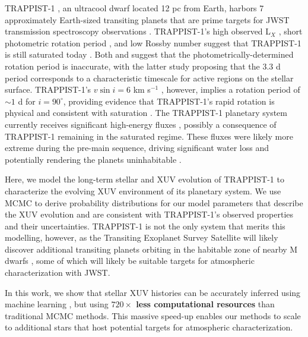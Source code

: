 \documentclass[twocolumn]{aastex62}
\def\lsim{~\rlap{$<$}{\lower 1.0ex\hbox{$\sim$}}}
\newcommand{\xxx}[1]{{\textbf{#1}}}
\newcommand{\approxposterior}[0]{\texttt{approxposterior}\xspace}
\begin{document}
TRAPPIST-1 \citep{Gillon2016,Gillon2017}, an ultracool dwarf located 12 pc from Earth, harbors 7 approximately Earth-sized transiting planets that are prime targets for JWST transmission spectroscopy observations \citep{Morley2017,Lincowski2018,Lustig2019}. TRAPPIST-1's high observed L$_{X}$ \citep{Wheatley2017}, short photometric rotation period \citep[3.3 d, ][]{Luger2017}, and low Rossby number \citep[Ro $\approx 0.01$, ][]{Roettenbacher2017} suggest that TRAPPIST-1 is still saturated today \citep{Pizzolato2003,Wright2011,Wright2018}. Both \citet{Roettenbacher2017} and \citet{Morris2018} suggest that the photometrically-determined rotation period is inaccurate, with the latter study proposing that the 3.3 d period corresponds to a characteristic timescale for active regions on the stellar surface. TRAPPIST-1's $v \sin i = 6$ km s$^{-1}$ \citep{Barnes2014}, however, implies a rotation period of ${\sim}1$ d for $i = 90^{\circ}$, providing evidence that TRAPPIST-1's rapid rotation is physical and consistent with saturation \citep[$P_{rot} \lsim 20$ d,][]{Wright2018}. The TRAPPIST-1 planetary system currently receives significant high-energy fluxes \citep{Bourrier2017b,Wheatley2017,Peacock2019}, possibly a consequence of TRAPPIST-1 remaining in the saturated regime. These fluxes were likely more extreme during the pre-main sequence, driving significant water loss and potentially rendering the planets uninhabitable \citep{Bolmont2017,Bourrier2017a}. 

Here, we model the long-term stellar and XUV evolution of TRAPPIST-1 to characterize the evolving XUV environment of its planetary system. We use MCMC to derive probability distributions for our model parameters that describe the XUV evolution and are consistent with TRAPPIST-1's observed properties and their uncertainties. TRAPPIST-1 is not the only system that merits this modelling, however, as the Transiting Exoplanet Survey Satellite will likely discover additional transiting planets orbiting in the habitable zone of nearby M dwarfs \citep{Barclay2018}, some of which will likely be suitable targets for atmospheric characterization with JWST. 

In this work, we show that stellar XUV histories can be accurately inferred using machine learning \citep[\approxposterior, ][]{FlemingVanderPlas2018}, but using \xxx{$720\times$ less computational resources} than traditional MCMC methods. This massive speed-up enables our methods to scale to additional stars that host potential targets for atmospheric characterization. 
\end{document}
